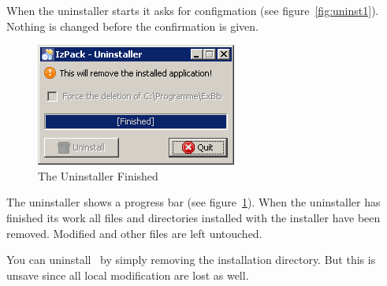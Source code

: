 When the uninstaller starts it asks for configmation (see
figure~\ref{fig:uninst1}). Nothing is changed before the confirmation
is given.

\begin{figure}[!ht]
  \centering
  \includegraphics[width=.45\textwidth]{img/uninst2}
  \caption{The Uninstaller Finished}
  \label{fig:uninst2}
\end{figure}

The uninstaller shows a progress bar (see figure~\ref{fig:uninst2}).
When the uninstaller has finished its work all files and directories
installed with the installer have been removed. Modified and other
files are left untouched.

You can uninstall \ExBib\ by simply removing the installation
directory.%
 But
this is unsave since all local modification are lost as well.



\endinput
%
